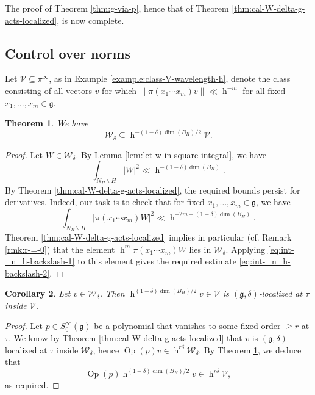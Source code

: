 \documentclass[reqno]{amsart}
\DeclareMathOperator{\h}{h}
\DeclareMathOperator{\Opp}{Op}
\theoremstyle{plain} \newtheorem{theorem} {Theorem}
\newtheorem{corollary} [theorem] {Corollary}
\theoremstyle{definition} \newtheorem{definition} [theorem] {Definition}
\theoremstyle{itplain} %
\numberwithin{equation}{section}
\numberwithin{theorem}{section}
\renewcommand{\geq}{\geqslant}
\begin{document}
The proof of Theorem \ref{thm:g-via-p}, hence that of Theorem \ref{thm:cal-W-delta-g-acts-localized}, is now complete.


\subsection{Control over norms}\label{sec:control-over-norms}

Let $\mathcal{V} \subseteq \pi^\infty$, as in Example \ref{example:class-V-wavelength-h}, denote the class consisting of all vectors $v$ for which $\|\pi(x_1 \dotsb x_m) v\| \ll \h^{-m}$ for all fixed $x_1,\dotsc,x_m \in \mathfrak{g}$.
\begin{theorem}\label{thm:control-over-norms}
  We have
  \begin{equation*}
    \mathcal{W}_\delta \subseteq \h^{-(1-\delta)\dim(B_H)/2} \mathcal{V}.
\end{equation*}
\end{theorem}
\begin{proof}
  Let $W \in \mathcal{W}_\delta$.  By Lemma \ref{lem:let-w-in-square-integral}, we have
  \begin{equation}\label{eq:int-_n_h-backslash-1}
    \int _{N_H \backslash H} |W|^2 \ll \h^{-(1-\delta) \dim(B_H)}.
  \end{equation}
  By Theorem \ref{thm:cal-W-delta-g-acts-localized}, the required bounds persist for derivatives.  Indeed, our task is to check that for fixed $x_1,\dotsc,x_m \in \mathfrak{g}$, we have
  \begin{equation}\label{eq:int-_n_h-backslash-2}
    \int  _{N_H \backslash H} \lvert
    \pi(x_1 \dotsb x_m) W
    \rvert^2
    \ll \h^{-2 m - (1 - \delta) \dim(B_H)}.
  \end{equation}
  Theorem \ref{thm:cal-W-delta-g-acts-localized} implies in particular (cf. Remark \ref{rmk:r-=-0}) that the element $\h^m \pi(x_1 \dotsb x_m) W$ lies in $\mathcal{W}_\delta$.  Applying \eqref{eq:int-_n_h-backslash-1} to this element gives the required estimate \eqref{eq:int-_n_h-backslash-2}.
\end{proof}


\begin{corollary}\label{cor:g-localization-inside-cal-V}
  Let $v \in \mathcal{W}_\delta$.  Then $\h^{(1 - \delta) \dim(B_H)/2} v \in \mathcal{V}$ is $(\mathfrak{g},\delta)$-localized at $\tau$ inside $\mathcal{V}$.
\end{corollary}
\begin{proof}
  Let $p \in S^\infty_0(\mathfrak{g})$ be a polynomial that vanishes to some fixed order $\geq r$ at $\tau$.  We know by Theorem \ref{thm:cal-W-delta-g-acts-localized} that $v$ is $(\mathfrak{g},\delta)$-localized at $\tau$ inside $\mathcal{W}_\delta$, hence $\Opp(p) v \in \h^{r \delta} \mathcal{W}_\delta$.  By Theorem \ref{thm:control-over-norms}, we deduce that
  \begin{equation*}
    \Opp(p) \h^{(1-\delta) \dim(B_H)/2} v \in \h^{r \delta} \mathcal{V},
  \end{equation*}
  as required.
\end{proof}
\end{document}
